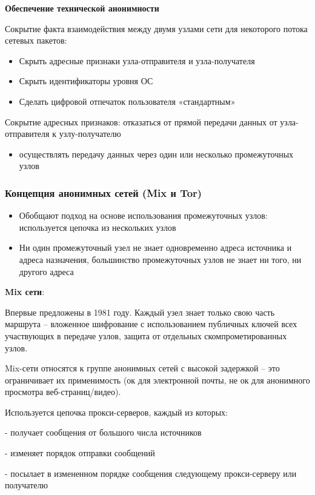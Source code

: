 \textbf{Обеспечение технической анонимности}

Сокрытие факта взаимодействия между двумя узлами сети для некоторого потока сетевых пакетов:
\begin{itemize}
    \item Скрыть адресные признаки узла-отправителя и узла-получателя
    \item Скрыть идентификаторы уровня ОС
    \item Сделать цифровой отпечаток пользователя «стандартным»
\end{itemize}

Сокрытие адресных признаков: отказаться от прямой передачи данных от узла-отправителя к узлу-получателю
\begin{itemize}
    \item осуществлять передачу данных через один или несколько промежуточных узлов
\end{itemize}

\subsubsection{Концепция анонимных сетей (Mix и Tor)}

\begin{itemize}
    \item Обобщают подход на основе использования промежуточных узлов: используется цепочка из нескольких узлов
    \item Ни один промежуточный узел не знает одновременно адреса источника и адреса назначения, большинство промежуточных узлов не знает ни того, ни другого адреса
\end{itemize}

\textbf{Mix сети}:

Впервые предложены в 1981 году. Каждый узел знает только свою часть маршрута -- вложенное шифрование с использованием публичных ключей всех участвующих в передаче узлов, защита от отдельных скомпрометированных узлов. 

Mix-сети относятся к группе анонимных сетей с высокой задержкой – это ограничивает их применимость (ок для электронной почты, не ок для анонимного просмотра веб-страниц/видео).

Используется цепочка прокси-серверов, каждый из которых:

- получает сообщения от большого числа источников
    
- изменяет порядок отправки сообщений
    
- посылает в измененном порядке сообщения следующему прокси-серверу или получателю

